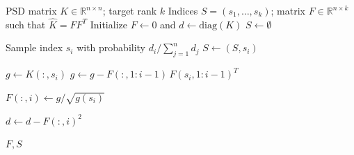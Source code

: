 \documentclass[11pt]{article}
\newcommand{\<}{\langle}
\renewcommand{\>}{\rangle}
\begin{document}
\begin{algorithm}[H]
\caption{RPCholesky}
\label{alg:rpcholesky}
\begin{algorithmic}[1]

\Require PSD matrix $K \in \mathbb{R}^{n \times n}$; target rank $k$
\Ensure Indices $S = (s_1, \ldots, s_k)$; matrix $F \in \mathbb{R}^{n \times k}$ such that $\hat{K} = FF^T$
\State Initialize $F \gets 0$ and $d \gets \mathrm{diag}(K)$
\State $S \gets \emptyset$

    \State Sample index $s_i$ with probability $d_i / \sum_{j=1}^n d_j$
    \State $S \gets (S, s_i)$
    
    \State $g \gets K(:, s_i)$ \label{line:compute_g1}
    \State $g \gets g - F(:,1:i-1)\, F(s_i,1:i-1)^T$ \label{line:compute_g2}
    
    \State $F(:,i) \gets g / \sqrt{g(s_i)}$ \label{line:compute_F}
    
    \State $d \gets d - F(:,i)^2$ \label{line:update_d}
\EndFor

\State \Return $F, S$
\EndFunction
\end{algorithmic}
\end{algorithm}
\end{document}
